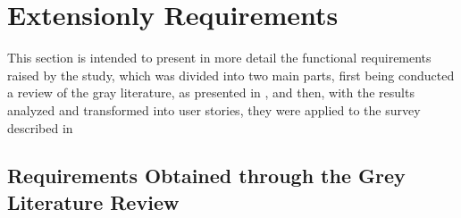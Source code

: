 \section{Extensionly Requirements}\label{sec:ext-req}
This section is intended to present in more detail the functional requirements raised by the study, which was divided into two main parts, first being conducted a review of the gray literature, as presented in , and then, with the results analyzed and transformed into user stories, they were applied to the survey described in 


\subsection{Requirements Obtained through the Grey Literature Review}\label{req-grey}

